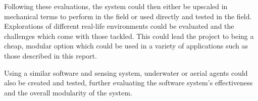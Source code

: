 Following these evaluations, the system could then either be upscaled in 
mechanical terms to perform in the field or used directly and tested in the 
field. Explorations of different real-life environments could be evaluated 
and the challenges which come with those tackled. This could lead the 
project to being a cheap, modular option which could be used in a variety of 
applications such as those described in this report. 

Using a similar software and sensing system, underwater or aerial agents 
could also be created and tested, further evaluating the software system's 
effectiveness and the overall modularity of the system. 